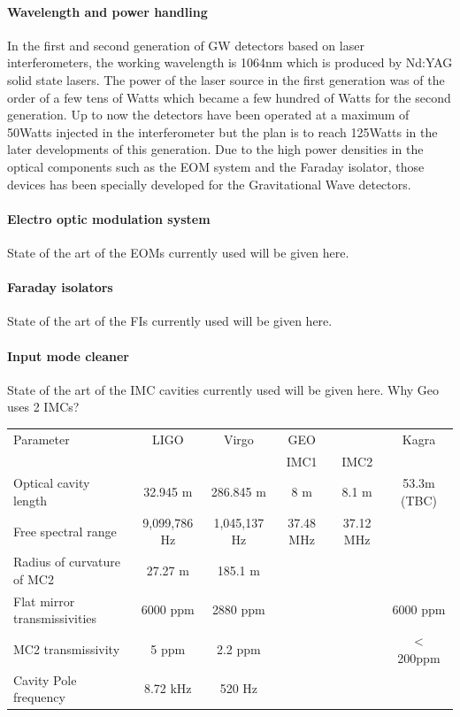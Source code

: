 \paragraph {Wavelength and power handling}
In the first and second generation of GW detectors based on laser interferometers, the working wavelength is 1064nm which is produced by Nd:YAG solid state lasers. The power of the laser source in the first generation was of the order of a few tens of Watts which became a few hundred of Watts for the second generation. Up to now the detectors have been operated at a maximum of 50Watts injected in the interferometer but the plan is to reach 125Watts in the later developments of this generation. Due to the high power densities in the optical components such as the EOM system and the Faraday isolator, those devices has been specially developed for the Gravitational Wave detectors. 

\paragraph {Electro optic modulation system}
State of the art of the EOMs currently used will be given here.

\paragraph {Faraday isolators}
State of the art of the FIs currently used will be given here.

\paragraph {Input mode cleaner}
State of the art of the IMC cavities currently used will be given here.
Why Geo uses 2 IMCs?

\begin{table}[htp]
\begin{tabular}{@{}l c c c c c@{}}
Parameter & LIGO & Virgo & GEO & &Kagra\\
       &  &   &  IMC1  & IMC2 &  \\
\hline
Optical cavity length & 32.945 m & 286.845 m & 8 m & 8.1 m & 53.3m (TBC)\\
Free spectral range & 9,099,786 Hz & 1,045,137 Hz & 37.48 MHz & 37.12 MHz &\\
Radius of curvature of MC2 & 27.27 m & 185.1 m& & &\\
Flat mirror transmissivities & 6000 ppm & 2880 ppm & & & 6000 ppm \\
MC2 transmissivity & 5 ppm & 2.2 ppm & & &< 200ppm\\
Cavity Pole frequency & 8.72 kHz & 520 Hz & & & \\
\hline
\end{tabular}
\label{IMC cavities main parameters}
\end{table}

